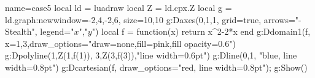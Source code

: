 \documentclass[border=2 mm]{standalone}
\begin{document}
\begin{luadraw}{name=case5}
local ld = luadraw
local Z = ld.cpx.Z
local g = ld.graph:new{window={-2,4,-2,6}, size={10,10}}
g:Daxes({0,1,1}, {grid=true, arrows="-Stealth", legend={"$x$","$y$"}})
local f = function(x) return x^2-2*x end
g:Ddomain1(f,{ x={1,3},draw_options="draw=none,fill=pink,fill opacity=0.6"}) 
g:Dpolyline({{1,Z(1,f(1))}, {3,Z(3,f(3))}},"line width=0.6pt")
g:Dline({0,1}, "blue, line width=0.8pt") 
g:Dcartesian(f, {draw_options="red, line width=0.8pt"}); 
g:Show()
\end{luadraw}
\end{document}
